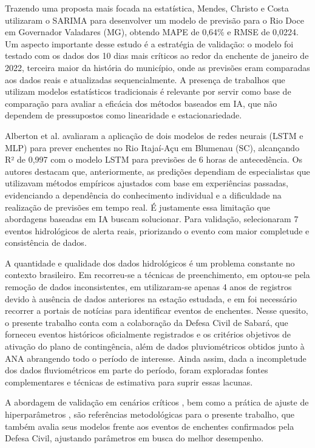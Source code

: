 \documentclass[12pt]{article}
\begin{document}
Trazendo uma proposta mais focada na estatística, Mendes, Christo e Costa \cite{mendes2024} utilizaram o SARIMA para desenvolver um modelo de previsão para o Rio Doce em Governador Valadares (MG), obtendo MAPE de 0,64\% e RMSE de 0,0224. Um aspecto importante desse estudo é a estratégia de validação: o modelo foi testado com os dados dos 10 dias mais críticos ao redor da enchente de janeiro de 2022, terceira maior da história do município, onde as previsões eram comparadas aos dados reais e atualizadas sequencialmente. A presença de trabalhos que utilizam modelos estatísticos tradicionais é relevante por servir como base de comparação para avaliar a eficácia dos métodos baseados em IA, que não dependem de pressupostos como linearidade e estacionariedade.

Alberton et al. \cite{alberton2021} avaliaram a aplicação de dois modelos de redes neurais (LSTM e MLP) para prever enchentes no Rio Itajaí-Açu em Blumenau (SC), alcançando R² de 0,997 com o modelo LSTM para previsões de 6 horas de antecedência. Os autores destacam que, anteriormente, as predições dependiam de especialistas que utilizavam métodos empíricos ajustados com base em experiências passadas, evidenciando a dependência do conhecimento individual e a dificuldade na realização de previsões em tempo real. É justamente essa limitação que abordagens baseadas em IA buscam solucionar. Para validação, selecionaram 7 eventos hidrológicos de alerta reais, priorizando o evento com maior completude e consistência de dados.

A quantidade e qualidade dos dados hidrológicos é um problema constante no contexto brasileiro. Em \cite{ramos2025} recorreu-se a técnicas de preenchimento, em \cite{sperb1999} optou-se pela remoção de dados inconsistentes, em \cite{mendes2024} utilizaram-se apenas 4 anos de registros devido à ausência de dados anteriores na estação estudada, e em \cite{parreira2025} foi necessário recorrer a portais de notícias para identificar eventos de enchentes. Nesse quesito, o presente trabalho conta com a colaboração da Defesa Civil de Sabará, que forneceu eventos históricos oficialmente registrados e os critérios objetivos de ativação do plano de contingência, além de dados pluviométricos obtidos junto à ANA abrangendo todo o período de interesse. Ainda assim, dada a incompletude dos dados fluviométricos em parte do período, foram exploradas fontes complementares e técnicas de estimativa para suprir essas lacunas.

A abordagem de validação em cenários críticos \cite{alberton2021, mendes2024}, bem como a prática de ajuste de hiperparâmetros \cite{alberton2021, parreira2025}, são referências metodológicas para o presente trabalho, que também avalia seus modelos frente aos eventos de enchentes confirmados pela Defesa Civil, ajustando parâmetros em busca do melhor desempenho.
\end{document}
